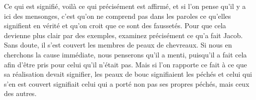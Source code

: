 Ce qui est signifié, voilà ce qui précisément est affirmé,
	et si l’on pense qu’il y a ici des mensonges,
	c’est qu’on ne comprend pas dans les paroles
		ce qu’elles signifient en vérité
	et qu’on croit que ce sont des faussetés.
Pour que cela devienne plus clair par des exemples,
	examinez précisément ce qu’a fait Jacob.
Sans doute, il s’est couvert les membres de peaux de chevreaux.
Si nous en cherchons la cause immédiate, nous penserons qu’il a menti,
	puisqu’il a fait cela afin d’être pris pour celui qu’il n’était pas.
Mais si l’on rapporte ce fait à ce que sa réalisation devait signifier,
	les peaux de bouc signifiaient les péchés
	et celui qui s’en est couvert signifiait celui qui a porté
		non pas ses propres péchés,
	mais ceux des autres.
